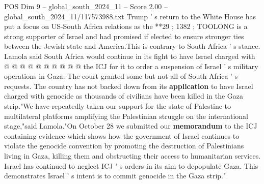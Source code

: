 \begin{textsample}{POS Dim 9 – global\_south\_2024\_11 – Score 2.00 – global\_south\_2024\_11/117573988.txt}
Trump ' s return to the White House has put a focus on US-South Africa relations as the **29 ; 1382 ; TOOLONG is a strong supporter of Israel and had promised if elected to ensure stronger ties between the Jewish state and America.This is contrary to South Africa ' s stance.
Lamola said South Africa would continue in its fight to have Israel charged with @ @ @ @ @ @ @ @ @ @ the ICJ for it to order a suspension of Israel ' s military operations in Gaza.
The court granted some but not all of South Africa ' s requests.
The country has not backed down from its \textbf{application} to have Israel charged with genocide as thousands of civilians have been killed in the Gaza strip."We have repeatedly taken our support for the state of Palestine to multilateral platforms amplifying the Palestinian struggle on the international stage,"said Lamola."On October 28 we submitted our \textbf{memorandum} to the ICJ containing evidence which shows how the government of Israel continues to violate the genocide convention by promoting the destruction of Palestinians living in Gaza, killing them and obstructing their access to humanitarian services.
Israel has continued to neglect ICJ ' s orders in its aim to depopulate Gaza.
This demonstrates Israel ' s intent is to commit genocide in the Gaza strip."

\end{textsample}

